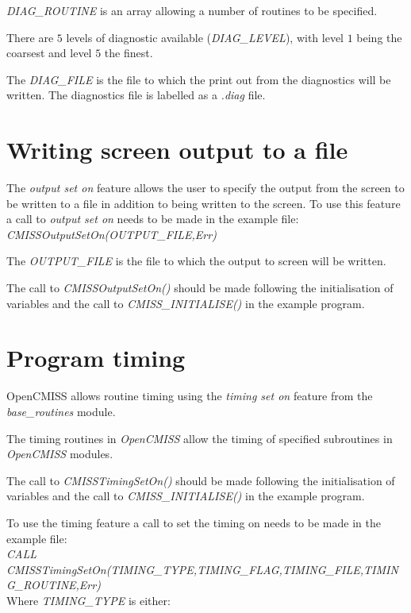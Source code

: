 \emph{DIAG\_ROUTINE} is an array allowing a number of routines to be specified.

\noindent There are $5$ levels of diagnostic available (\emph{DIAG\_LEVEL}), 
with level $1$ being the coarsest and level $5$ the finest. 

The \emph{DIAG\_FILE} is the file to which the print out from the diagnostics 
will be written. The diagnostics file is labelled as a \emph{.diag} file.


\section{Writing screen output to a file}

The \emph{output set on} feature allows the user to specify the output from 
the screen to be written to a file in addition to being written to the screen. 
To use this feature a call to \emph{output set on} needs to be made in the 
example file: \\
\linebreak
\emph{CMISSOutputSetOn(OUTPUT\_FILE,Err)}
\linebreak

\noindent The \emph{OUTPUT\_FILE} is the file to which the output to screen will
be written.

The call to \emph{CMISSOutputSetOn()} should be made following the 
initialisation of variables and the call to \emph{CMISS\_INITIALISE()} in the
example program.


\section{Program timing}
\label{sec:programtiming}

OpenCMISS allows routine timing using the \emph{timing set on} 
feature from the \emph{base\_routines} module.

The timing routines in \emph{OpenCMISS} allow the timing of 
specified subroutines in \emph{OpenCMISS} modules.

The call to \emph{CMISSTimingSetOn()} should be made following the 
initialisation of variables and the call to \emph{CMISS\_INITIALISE()} 
in the example program.

To use the timing feature a call to set the timing on needs to 
be made in the example file: \\
\linebreak
\emph{CALL
CMISSTimingSetOn(TIMING\_TYPE,TIMING\_FLAG,TIMING\_FILE,TIMING\_ROUTINE,Err)}
\\ 
\linebreak
\noindent Where \emph{TIMING\_TYPE} is either: \\

